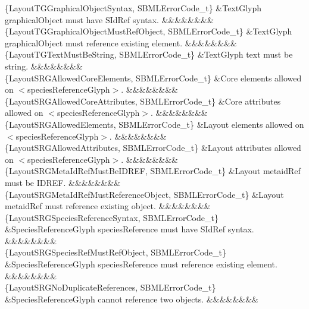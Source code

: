 \begin{DoxyParagraph}{}
\begin{longtabu}
\{Layout\+T\+G\+Graphical\+Object\+Syntax, S\+B\+M\+L\+Error\+Code\+\_\+t\} &Text\+Glyph \textquotesingle{}graphical\+Object\textquotesingle{} must have S\+Id\+Ref syntax. &&&&&&&&\\
\{Layout\+T\+G\+Graphical\+Object\+Must\+Ref\+Object, S\+B\+M\+L\+Error\+Code\+\_\+t\} &Text\+Glyph \textquotesingle{}graphical\+Object\textquotesingle{} must reference existing element. &&&&&&&&\\
\{Layout\+T\+G\+Text\+Must\+Be\+String, S\+B\+M\+L\+Error\+Code\+\_\+t\} &Text\+Glyph \textquotesingle{}text\textquotesingle{} must be string. &&&&&&&&\\
\{Layout\+S\+R\+G\+Allowed\+Core\+Elements, S\+B\+M\+L\+Error\+Code\+\_\+t\} &Core elements allowed on {\ttfamily $<$species\+Reference\+Glyph$>$}. &&&&&&&&\\
\{Layout\+S\+R\+G\+Allowed\+Core\+Attributes, S\+B\+M\+L\+Error\+Code\+\_\+t\} &Core attributes allowed on {\ttfamily $<$species\+Reference\+Glyph$>$}. &&&&&&&&\\
\{Layout\+S\+R\+G\+Allowed\+Elements, S\+B\+M\+L\+Error\+Code\+\_\+t\} &Layout elements allowed on {\ttfamily $<$species\+Reference\+Glyph$>$}. &&&&&&&&\\
\{Layout\+S\+R\+G\+Allowed\+Attributes, S\+B\+M\+L\+Error\+Code\+\_\+t\} &Layout attributes allowed on {\ttfamily $<$species\+Reference\+Glyph$>$}. &&&&&&&&\\
\{Layout\+S\+R\+G\+Meta\+Id\+Ref\+Must\+Be\+I\+D\+R\+EF, S\+B\+M\+L\+Error\+Code\+\_\+t\} &Layout \textquotesingle{}metaid\+Ref\textquotesingle{} must be I\+D\+R\+EF. &&&&&&&&\\
\{Layout\+S\+R\+G\+Meta\+Id\+Ref\+Must\+Reference\+Object, S\+B\+M\+L\+Error\+Code\+\_\+t\} &Layout \textquotesingle{}metaid\+Ref\textquotesingle{} must reference existing object. &&&&&&&&\\
\{Layout\+S\+R\+G\+Species\+Reference\+Syntax, S\+B\+M\+L\+Error\+Code\+\_\+t\} &Species\+Reference\+Glyph \textquotesingle{}species\+Reference\textquotesingle{} must have S\+Id\+Ref syntax. &&&&&&&&\\
\{Layout\+S\+R\+G\+Species\+Ref\+Must\+Ref\+Object, S\+B\+M\+L\+Error\+Code\+\_\+t\} &Species\+Reference\+Glyph \textquotesingle{}species\+Reference\textquotesingle{} must reference existing element. &&&&&&&&\\
\{Layout\+S\+R\+G\+No\+Duplicate\+References, S\+B\+M\+L\+Error\+Code\+\_\+t\} &Species\+Reference\+Glyph cannot reference two objects. &&&&&&&&\\

\end{longtabu}
\end{DoxyParagraph}
